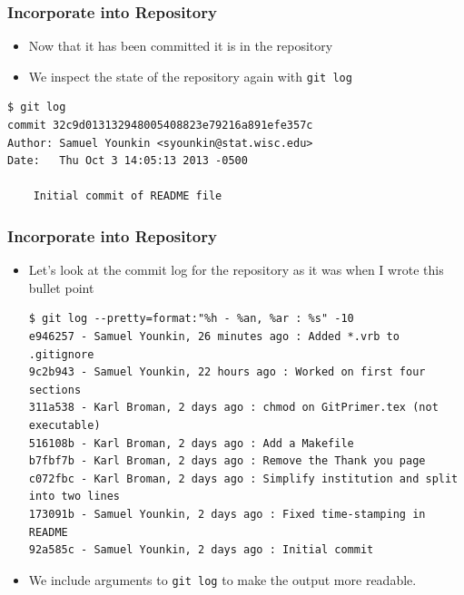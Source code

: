 \documentclass[handout,13pt,compress,c]{beamer}
\newcommand{\bi}{\begin{itemize}}
\newcommand{\ei}{\end{itemize}}
\begin{document}
\begin{frame}[fragile]
\frametitle{Incorporate into Repository}
\bi
\item Now that it has been committed it is in the repository 
\item We inspect the state of the repository again with \texttt{git log}
\ei
\begin{semiverbatim}
\begin{lstlisting}
$ git log
commit 32c9d013132948005408823e79216a891efe357c
Author: Samuel Younkin <syounkin@stat.wisc.edu>
Date:   Thu Oct 3 14:05:13 2013 -0500

    Initial commit of README file

\end{lstlisting}
\end{semiverbatim}
\end{frame}
\begin{frame}[fragile]
\frametitle{Incorporate into Repository}
\bi
\item Let's look at the commit log for the repository as it was when I wrote this bullet point
{\footnotesize \begin{semiverbatim}
\begin{lstlisting}
$ git log --pretty=format:"%h - %an, %ar : %s" -10
e946257 - Samuel Younkin, 26 minutes ago : Added *.vrb to .gitignore
9c2b943 - Samuel Younkin, 22 hours ago : Worked on first four sections
311a538 - Karl Broman, 2 days ago : chmod on GitPrimer.tex (not executable)
516108b - Karl Broman, 2 days ago : Add a Makefile
b7fbf7b - Karl Broman, 2 days ago : Remove the Thank you page
c072fbc - Karl Broman, 2 days ago : Simplify institution and split into two lines
173091b - Samuel Younkin, 2 days ago : Fixed time-stamping in README
92a585c - Samuel Younkin, 2 days ago : Initial commit
\end{lstlisting}
\end{semiverbatim}}
\item We include arguments to \texttt{git log} to make the output more readable.
\ei
\end{frame}
\end{document}
